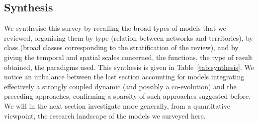 \documentclass[10pt]{article}
\begin{document}


\subsection{Synthesis}

We synthesise this survey by recalling the broad types of models that we reviewed, organising them by type (relation between networks and territories), by class (broad classes corresponding to the stratification of the review), and by giving the temporal and spatial scales concerned, the functions, the type of result obtained, the paradigms used. This synthesis is given in Table~\ref{tab:synthesis}. We notice an unbalance between the last section accounting for models integrating effectively a strongly coupled dynamic (and possibly a co-evolution) and the preceding approaches, confirming a sparsity of such approaches suggested before. We will in the next section investigate more generally, from a quantitative viewpoint, the research landscape of the models we surveyed here.
\end{document}
